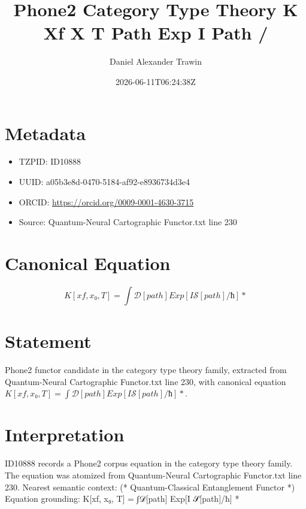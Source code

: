 \documentclass[11pt]{article}
\title{Phone2 Category Type Theory K Xf X T Path Exp I Path /}
\author{Daniel Alexander Trawin}
\date{2026-06-11T06:24:38Z}
\begin{document}
\maketitle
\section*{Metadata}
\begin{itemize}
\item TZPID: ID10888
\item UUID: a05b3e8d-0470-5184-af92-e8936734d3e4
\item ORCID: \url{https://orcid.org/0009-0001-4630-3715}
\item Source: Quantum-Neural Cartographic Functor.txt line 230
\end{itemize}
\section*{Canonical Equation}
\[
K[xf, x₀, T] = ∫𝒟[path] Exp[I 𝒮[path]/ħ] *
\]
\section*{Statement}
Phone2 functor candidate in the category type theory family, extracted from Quantum-Neural Cartographic Functor.txt line 230, with canonical equation $K[xf, x₀, T] = ∫𝒟[path] Exp[I 𝒮[path]/ħ] *$.
\section*{Interpretation}
ID10888 records a Phone2 corpus equation in the category type theory family. The equation was atomized from Quantum-Neural Cartographic Functor.txt line 230. Nearest semantic context: (* Quantum-Classical Entanglement Functor *) Equation grounding: K[xf, x₀, T] = ∫𝒟[path] Exp[I 𝒮[path]/ħ] *
\end{document}

